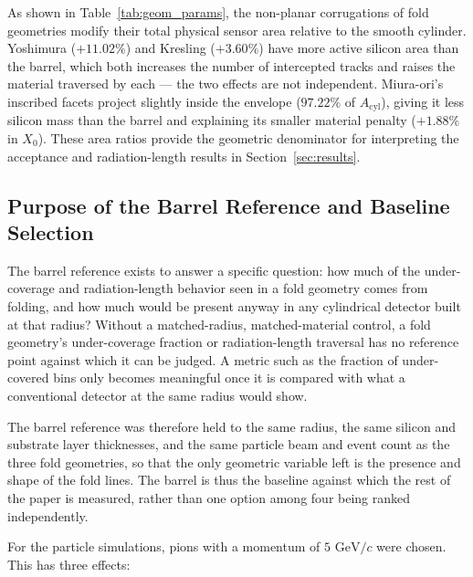 \documentclass[a4paper,11pt]{article}
\begin{document}
As shown in Table~\ref{tab:geom_params}, the non-planar corrugations of fold geometries modify their total physical sensor area relative to the smooth cylinder. Yoshimura ($+11.02\%$) and Kresling ($+3.60\%$) have more active silicon area than the barrel, which both increases the number of intercepted tracks and raises the material traversed by each --- the two effects are not independent. Miura-ori's inscribed facets project slightly inside the envelope ($97.22\%$ of $A_{\text{cyl}}$), giving it less silicon mass than the barrel and explaining its smaller material penalty ($+1.88\%$ in $X_0$). These area ratios provide the geometric denominator for interpreting the acceptance and radiation-length results in Section~\ref{sec:results}.

\FloatBarrier
\subsection{Purpose of the Barrel Reference and Baseline Selection}
\label{sec:baseline}

The barrel reference exists to answer a specific question: how much of the under-coverage and radiation-length behavior seen in a fold geometry comes from folding, and how much would be present anyway in any cylindrical detector built at that radius? Without a matched-radius, matched-material control, a fold geometry's under-coverage fraction or radiation-length traversal has no reference point against which it can be judged. A metric such as the fraction of under-covered bins only becomes meaningful once it is compared with what a conventional detector at the same radius would show.

The barrel reference was therefore held to the same radius, the same silicon and substrate layer thicknesses, and the same particle beam and event count as the three fold geometries, so that the only geometric variable left is the presence and shape of the fold lines. The barrel is thus the baseline against which the rest of the paper is measured, rather than one option among four being ranked independently.

For the particle simulations, pions with a momentum of $5\text{ GeV}/c$ were chosen. This has three effects:
\end{document}
